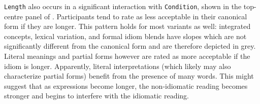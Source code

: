 \documentclass[output=paper
,modfonts
,nonflat]{langsci/langscibook}
\begin{document}
\texttt{Length} also occurs in a significant interaction with \texttt{Condition}, shown in the top-centre panel of . Participants tend to rate  as less acceptable  in their canonical form if they are longer. This pattern holds for most variants as well: integrated concepts,  lexical variation,  and formal idiom blends  have slopes which are not significantly different from the canonical form and are therefore depicted in grey. Literal meanings  and partial forms  however are rated as more acceptable if the idiom is longer. Apparently, literal interpretations (which likely may also characterize partial forms) benefit from the presence of many words. This might suggest that as expressions become longer, the non-idiomatic reading becomes stronger and begins to interfere with the idiomatic reading.\\
\end{document}
